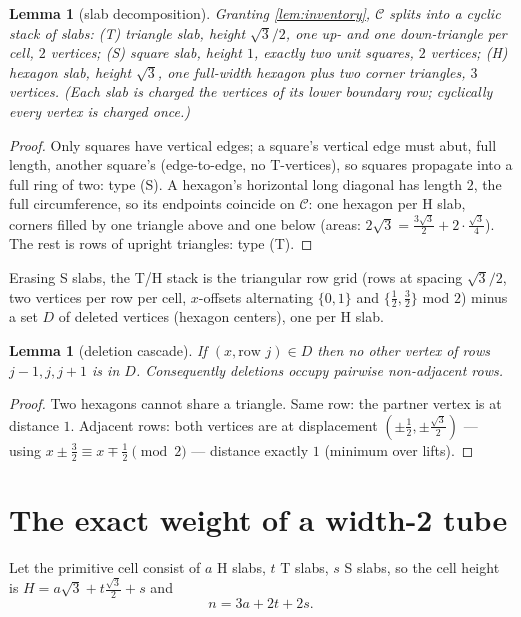\documentclass[11pt,a4paper,oneside]{article}
\theoremstyle{plain}
\newtheorem{lemma}[theorem]{Lemma}
\theoremstyle{definition}
\theoremstyle{remark}
\begin{document}
\begin{lemma}[slab decomposition]\label{lem:slabs}
Granting \cref{lem:inventory}, $\mathcal{C}$ splits into a cyclic stack of slabs:
\emph{(T)} triangle slab, height $\sqrt3/2$, one up- and one down-triangle per cell,
$2$ vertices; \emph{(S)} square slab, height $1$, exactly two unit squares, $2$ vertices;
\emph{(H)} hexagon slab, height $\sqrt3$, one full-width hexagon plus two corner triangles,
$3$ vertices. (Each slab is charged the vertices of its lower boundary row; cyclically every
vertex is charged once.)
\end{lemma}
\begin{proof}
Only squares have vertical edges; a square's vertical edge must abut, full length, another
square's (edge-to-edge, no T-vertices), so squares propagate into a full ring of two: type
(S). A hexagon's horizontal long diagonal has length $2$, the full circumference, so its
endpoints coincide on $\mathcal{C}$: one hexagon per H slab, corners filled by one triangle
above and one below (areas: $2\sqrt3 = \tfrac{3\sqrt3}{2} + 2\cdot\tfrac{\sqrt3}{4}$). The
rest is rows of upright triangles: type (T).
\end{proof}

Erasing S slabs, the T/H stack is the triangular row grid (rows at spacing $\sqrt3/2$, two
vertices per row per cell, $x$-offsets alternating $\{0,1\}$ and $\{\tfrac12,\tfrac32\}$
mod $2$) minus a set $D$ of deleted vertices (hexagon centers), one per H slab.

\begin{lemma}[deletion cascade]\label{lem:cascade}
If $(x, \text{row } j) \in D$ then no other vertex of rows $j{-}1, j, j{+}1$ is in $D$.
Consequently deletions occupy pairwise non-adjacent rows.
\end{lemma}
\begin{proof}
Two hexagons cannot share a triangle. Same row: the partner vertex is at distance $1$.
Adjacent rows: both vertices are at displacement $(\pm\tfrac12, \pm\tfrac{\sqrt3}{2})$ ---
using $x \pm \tfrac32 \equiv x \mp \tfrac12 \pmod 2$ --- distance exactly $1$ (minimum over
lifts).
\end{proof}

\section{The exact weight of a width-2 tube}\label{sec:weight}

Let the primitive cell consist of $a$ H slabs, $t$ T slabs, $s$ S slabs, so the cell height
is $H = a\sqrt3 + t\tfrac{\sqrt3}{2} + s$ and
\begin{equation}\label{eq:vertexcount}
n = 3a + 2t + 2s.
\end{equation}
\end{document}
